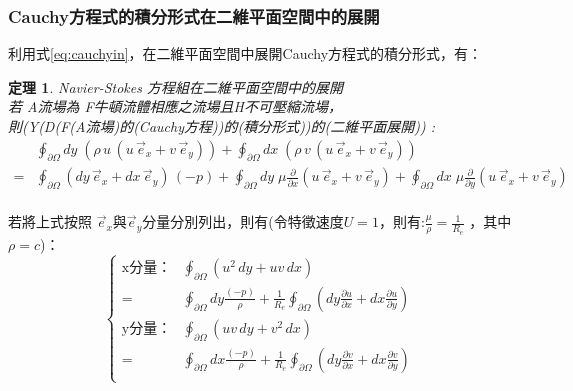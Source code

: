 \documentclass[12pt]{article}
\theoremstyle{upright}
\newtheorem{theorem}{定理}[section]
\begin{document}
\subsubsection {Cauchy方程式的積分形式在二維平面空間中的展開}
\noindent 利用式\eqref{eq:cauchyin}，在二維平面空間中展開Cauchy方程式的積分形式，有：
\begin{theorem} Navier-Stokes 方程組在二維平面空間中的展開
\mbox{}\\[0.3ex]
\noindent 若 \quad A流場為 F牛頓流體相應之流場且H不可壓縮流場，\\[1.5ex ]
則\quad  (Y(D(F(A流場)的(Cauchy方程))的(積分形式))的(二維平面展開)) : 
\begin{equation}\begin{aligned}
    &\oint_{\partial \Omega} dy \;\left(\rho\, u\,( u\,\vec{e}_x + v\,\vec{e}_y )\right) + \oint_{\partial \Omega} dx \;\left(\rho\, v\,( u\,\vec{e}_x + v\,\vec{e}_y )\right) \\[1.5ex]
    =& \oint_{\partial \Omega} (dy\,\vec{e}_x + dx\,\vec{e}_y)\,(-p) 
    + \oint_{\partial \Omega } dy \;\mu\frac{\partial }{\partial x} \left(u\,\vec{e}_x + v\,\vec{e}_y \right) + \oint_{\partial \Omega } dx \;\mu\frac{\partial }{\partial y} \left(u\,\vec{e}_x + v\,\vec{e}_y \right) \\[1.5ex]
\end{aligned}\end{equation} 
\end{theorem}
\noindent 若將上式按照 $\vec{e}_x$與$\vec{e}_y$分量分別列出，則有(令特徵速度$U = 1$，則有:$\frac{\mu}{\rho} = \frac{1}{R_{e}} $ ，其中$\rho = c$)：
\begin{equation}\left\{\begin{aligned}
    \text{x分量：}
    &\oint_{\partial \Omega} \left( u^2\,dy + u v\,dx \right) \\[1.5ex]
    =& \oint_{\partial \Omega} dy \frac{(-p )}{\rho }  + \frac{1}{R_{e}}\oint_{\partial \Omega } \left(dy\frac{\partial u}{\partial x} + dx\frac{\partial u}{\partial y} \right)\\[1.5ex]
    \text{y分量：}
    &\oint_{\partial \Omega} \left( u v\,dy + v^2\,dx \right) \\[1.5ex]
    =& \oint_{\partial \Omega} dx\frac{(-p )}{\rho }  + \frac{1}{R_{e}} \oint_{\partial \Omega } \left(dy\frac{\partial v}{\partial x} + dx\frac{\partial v}{\partial y} \right)\\[1.5ex]
\end{aligned}\right.\end{equation}
\end{document}
